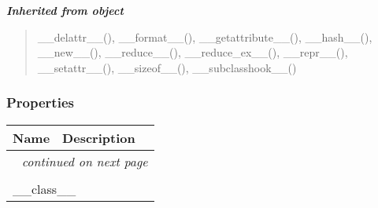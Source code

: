 \large{\textbf{\textit{Inherited from object}}}

\begin{quote}
\_\_delattr\_\_(), \_\_format\_\_(), \_\_getattribute\_\_(), \_\_hash\_\_(), \_\_new\_\_(), \_\_reduce\_\_(), \_\_reduce\_ex\_\_(), \_\_repr\_\_(), \_\_setattr\_\_(), \_\_sizeof\_\_(), \_\_subclasshook\_\_()
\end{quote}


  \subsubsection{Properties}

    \vspace{-1cm}
\hspace{\varindent}\begin{longtable}{|p{\varnamewidth}|p{\vardescrwidth}|l}
\cline{1-2}
\cline{1-2} \centering \textbf{Name} & \centering \textbf{Description}& \\
\cline{1-2}
\endhead\cline{1-2}\multicolumn{3}{r}{\small\textit{continued on next page}}\\\endfoot\cline{1-2}
\endlastfoot\multicolumn{2}{|l|}{\textit{Inherited from object}}\\
\multicolumn{2}{|p{\varwidth}|}{\raggedright \_\_class\_\_}\\
\cline{1-2}
\end{longtable}

